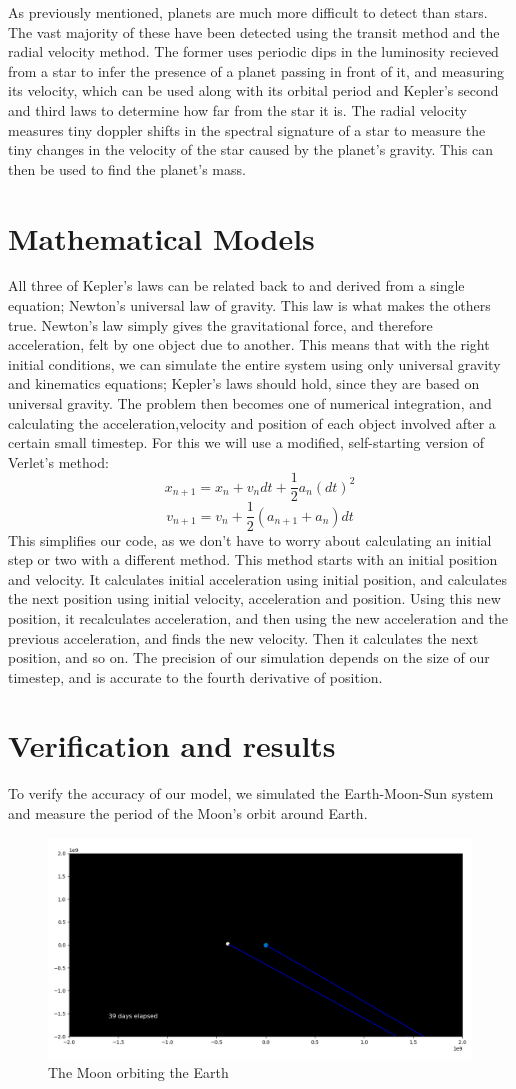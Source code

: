 \documentclass[12pt]{article}
\begin{document}
As previously mentioned, planets are much more difficult to detect than stars. The vast majority of these have been detected using the transit method and the radial velocity method. The former uses periodic dips in the luminosity recieved from a star to infer the presence of a planet passing in front of it, and measuring its velocity, which can be used along with its orbital period and Kepler's second and third laws to determine how far from the star it is. The radial velocity measures tiny doppler shifts in the spectral signature of a star to measure the tiny changes in the velocity of the star caused by the planet's gravity. This can then be used to find the planet's mass. 

\section{Mathematical Models}
All three of Kepler’s laws can be related back to and derived from a single equation; Newton’s universal law of gravity. This law is what makes the others true. Newton’s law simply gives the gravitational force, and therefore acceleration, felt by one object due to another. This means that with the right initial conditions, we can simulate the entire system using only universal gravity and kinematics equations; Kepler’s laws should hold, since they are based on universal gravity. The problem then becomes one of numerical integration, and calculating the acceleration,velocity and position of each object involved after a certain small timestep. For this we will use a modified, self-starting version of Verlet’s method: \[x_{n+1} = x_{n} + v_{n}dt + \frac{1}{2}a_{n}(dt)^{2}\]
\[v_{n+1} = v_{n} + \frac{1}{2}(a_{n+1} + a_{n})dt\]
This simplifies our code, as we don’t have to worry about calculating an initial step or two with a different method. This method starts with an initial position and velocity. It calculates initial acceleration using initial position, and calculates the next position using initial velocity, acceleration and position. Using this new position, it recalculates acceleration, and then using the new acceleration and the previous acceleration, and finds the new velocity. Then it calculates the next position, and so on. The precision of our simulation depends on the size of our timestep, and is accurate to the fourth derivative of position.

\section{Verification and results}
To verify the accuracy of our model, we simulated the Earth-Moon-Sun system and measure the period of the Moon's orbit around Earth. 

\begin{figure}[h]
    \centering
    \includegraphics[width=\textwidth]{sem}
    \caption{The Moon orbiting the Earth}
\end{figure}
\end{document}
